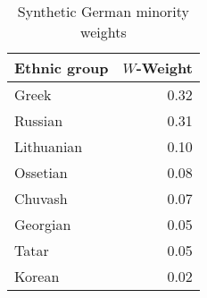 \begin{table}[t]

\caption{\label{tab:sc_weights}Synthetic German minority weights}
\centering
\begin{tabular}{lr}
\toprule
Ethnic group & $W$-Weight\\
\midrule
Greek & 0.32\\
Russian & 0.31\\
Lithuanian & 0.10\\
Ossetian & 0.08\\
Chuvash & 0.07\\
Georgian & 0.05\\
Tatar & 0.05\\
Korean & 0.02\\
\bottomrule
\end{tabular}
\end{table}